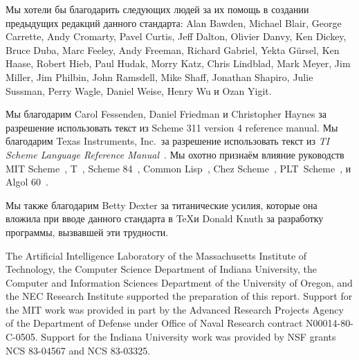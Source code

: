 Мы хотели бы благодарить следующих людей за их помощь в создании предыдущих редакций данного
стандарта: Alan Bawden, Michael Blair, George Carrette, Andy Cromarty, Pavel Curtis, Jeff
Dalton, Olivier Danvy, Ken Dickey, Bruce Duba, Marc Feeley, Andy Freeman, Richard Gabriel, Yekta
G\"ursel, Ken Haase, Robert Hieb, Paul Hudak, Morry Katz, Chris Lindblad, Mark Meyer, Jim
Miller, Jim Philbin, John Ramsdell, Mike Shaff, Jonathan Shapiro, Julie Sussman, Perry Wagle,
Daniel Weise, Henry Wu и Ozan Yigit.\vspace{4mm}

Мы благодарим Carol Fessenden, Daniel
Friedman и Christopher Haynes за разрешение использовать текст из Scheme 311
version 4 reference manual.  Мы благодарим Texas Instruments, Inc.~за разрешение
использовать текст из {\em TI Scheme Language Reference Manual}~\cite{TImanual85}.
Мы охотно признаём влияние руководств MIT Scheme~\cite{MITScheme},
T~\cite{Rees84}, Scheme 84~\cite{Scheme84}, Common Lisp~\cite{CLtL},
Chez Scheme~\cite{csug7}, PLT~Scheme~\cite{mzscheme352},
и Algol 60~\cite{Naur63}.\vspace{4mm}

\vest Мы также благодарим Betty Dexter за титанические усилия, которые она вложила при
вводе данного стандарта в \TeX и Donald Knuth за разработку программы,
вызвавшей эти трудности.\vspace{4mm}

\vest The Artificial Intelligence Laboratory of the
Massachusetts Institute of Technology, the Computer Science
Department of Indiana University, the Computer and Information
Sciences Department of the University of Oregon, and the NEC Research
Institute supported the preparation of this report.  Support for the MIT
work was provided in part by
the Advanced Research Projects Agency of the Department of Defense under Office
of Naval Research contract N00014-80-C-0505.  Support for the Indiana
University work was provided by NSF grants NCS 83-04567 and NCS
83-03325.


